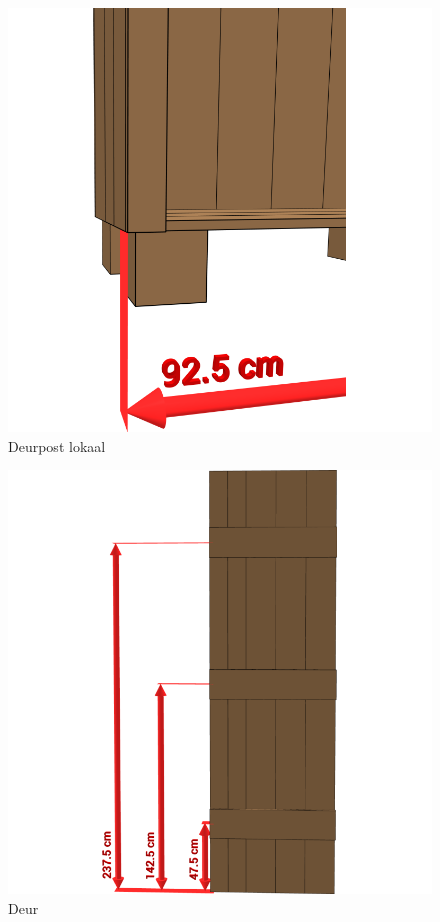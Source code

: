 \documentclass{article}
\begin{document}
\begin{figure}[h!]
    \centering
    \includegraphics[width=\textwidth]{scene 10 - deurpost b.png}
    \caption{Deurpost lokaal}
\end{figure}

\begin{figure}[h!]
    \centering
    \includegraphics[width=\textwidth]{scene 11 - deur.png}
    \caption{Deur}
\end{figure}
\end{document}
